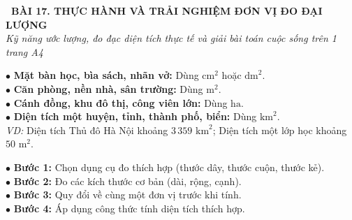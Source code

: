 \documentclass[14pt,a4paper,oneside]{extbook}
\begin{document}
\noindent
\begin{tcolorbox}[
  enhanced,
  colback=teal!8!white,
  colframe=teal!80!black,
  arc=3mm,
  boxrule=1.1pt,
  width=\linewidth,
  halign=center,
  top=2.2mm, bottom=2.2mm,
  left=3mm, right=3mm,
  drop fuzzy shadow
]
  {\large\bfseries\color{teal!95!black}\faBookmark\ BÀI 17. THỰC HÀNH VÀ TRẢI NGHIỆM ĐƠN VỊ ĐO ĐẠI LƯỢNG}\\[2pt]
  {\scriptsize\color{black!75}\itshape Kỹ năng ước lượng, đo đạc diện tích thực tế và giải bài toán cuộc sống trên 1 trang A4}
\end{tcolorbox}

\vspace{3.2mm}
\noindent
\begin{minipage}[t]{0.54\textwidth}
  \begin{tcolorbox}[
    enhanced,
    title={\footnotesize\bfseries\color{white}\faEye\ 1. Chọn đơn vị đo thích hợp với đối tượng},
    colback=blue!2!white,
    colframe=blue!75!black,
    arc=2.5mm, boxrule=0.8pt, top=1.8mm, bottom=1.8mm, left=2.2mm, right=2.2mm
  ]
    \footnotesize
    $\bullet$ \textbf{Mặt bàn học, bìa sách, nhãn vở:} Dùng $\text{cm}^2$ hoặc $\text{dm}^2$.\\
    $\bullet$ \textbf{Căn phòng, nền nhà, sân trường:} Dùng $\text{m}^2$.\\
    $\bullet$ \textbf{Cánh đồng, khu đô thị, công viên lớn:} Dùng $\text{ha}$.\\
    $\bullet$ \textbf{Diện tích một huyện, tỉnh, thành phố, biển:} Dùng $\text{km}^2$.\\
    \textit{VD:} Diện tích Thủ đô Hà Nội khoảng $3\,359\text{ km}^2$; Diện tích một lớp học khoảng $50\text{ m}^2$.
  \end{tcolorbox}
\end{minipage}%
\hfill
\begin{minipage}[t]{0.44\textwidth}
  \begin{tcolorbox}[
    enhanced,
    title={\footnotesize\bfseries\color{white}\faCompass\ 2. Kỹ năng đo đạc thực tế},
    colback=teal!2!white,
    colframe=teal!75!black,
    arc=2.5mm, boxrule=0.8pt, top=1.8mm, bottom=1.8mm, left=2mm, right=2mm
  ]
    \footnotesize
    $\bullet$ \textbf{Bước 1:} Chọn dụng cụ đo thích hợp (thước dây, thước cuộn, thước kẻ).\\
    $\bullet$ \textbf{Bước 2:} Đo các kích thước cơ bản (dài, rộng, cạnh).\\
    $\bullet$ \textbf{Bước 3:} Quy đổi về cùng một đơn vị trước khi tính.\\
    $\bullet$ \textbf{Bước 4:} Áp dụng công thức tính diện tích thích hợp.
  \end{tcolorbox}
\end{minipage}
\end{document}
